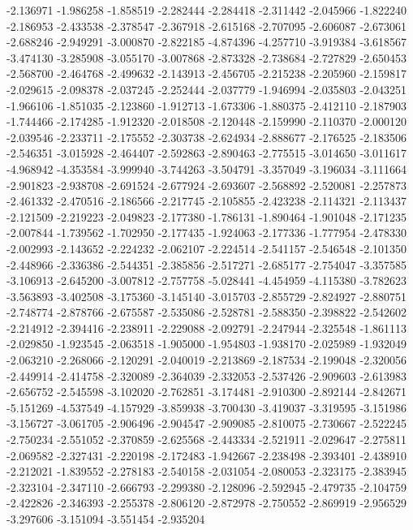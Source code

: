 -2.136971
-1.986258
-1.858519
-2.282444
-2.284418
-2.311442
-2.045966
-1.822240
-2.186953
-2.433538
-2.378547
-2.367918
-2.615168
-2.707095
-2.606087
-2.673061
-2.688246
-2.949291
-3.000870
-2.822185
-4.874396
-4.257710
-3.919384
-3.618567
-3.474130
-3.285908
-3.055170
-3.007868
-2.873328
-2.738684
-2.727829
-2.650453
-2.568700
-2.464768
-2.499632
-2.143913
-2.456705
-2.215238
-2.205960
-2.159817
-2.029615
-2.098378
-2.037245
-2.252444
-2.037779
-1.946994
-2.035803
-2.043251
-1.966106
-1.851035
-2.123860
-1.912713
-1.673306
-1.880375
-2.412110
-2.187903
-1.744466
-2.174285
-1.912320
-2.018508
-2.120448
-2.159990
-2.110370
-2.000120
-2.039546
-2.233711
-2.175552
-2.303738
-2.624934
-2.888677
-2.176525
-2.183506
-2.546351
-3.015928
-2.464407
-2.592863
-2.890463
-2.775515
-3.014650
-3.011617
-4.968942
-4.353584
-3.999940
-3.744263
-3.504791
-3.357049
-3.196034
-3.111664
-2.901823
-2.938708
-2.691524
-2.677924
-2.693607
-2.568892
-2.520081
-2.257873
-2.461332
-2.470516
-2.186566
-2.217745
-2.105855
-2.423238
-2.114321
-2.113437
-2.121509
-2.219223
-2.049823
-2.177380
-1.786131
-1.890464
-1.901048
-2.171235
-2.007844
-1.739562
-1.702950
-2.177435
-1.924063
-2.177336
-1.777954
-2.478330
-2.002993
-2.143652
-2.224232
-2.062107
-2.224514
-2.541157
-2.546548
-2.101350
-2.448966
-2.336386
-2.544351
-2.385856
-2.517271
-2.685177
-2.754047
-3.357585
-3.106913
-2.645200
-3.007812
-2.757758
-5.028441
-4.454959
-4.115380
-3.782623
-3.563893
-3.402508
-3.175360
-3.145140
-3.015703
-2.855729
-2.824927
-2.880751
-2.748774
-2.878766
-2.675587
-2.535086
-2.528781
-2.588350
-2.398822
-2.542602
-2.214912
-2.394416
-2.238911
-2.229088
-2.092791
-2.247944
-2.325548
-1.861113
-2.029850
-1.923545
-2.063518
-1.905000
-1.954803
-1.938170
-2.025989
-1.932049
-2.063210
-2.268066
-2.120291
-2.040019
-2.213869
-2.187534
-2.199048
-2.320056
-2.449914
-2.414758
-2.320089
-2.364039
-2.332053
-2.537426
-2.909603
-2.613983
-2.656752
-2.545598
-3.102020
-2.762851
-3.174481
-2.910300
-2.892144
-2.842671
-5.151269
-4.537549
-4.157929
-3.859938
-3.700430
-3.419037
-3.319595
-3.151986
-3.156727
-3.061705
-2.906496
-2.904547
-2.909085
-2.810075
-2.730667
-2.522245
-2.750234
-2.551052
-2.370859
-2.625568
-2.443334
-2.521911
-2.029647
-2.275811
-2.069582
-2.327431
-2.220198
-2.172483
-1.942667
-2.238498
-2.393401
-2.438910
-2.212021
-1.839552
-2.278183
-2.540158
-2.031054
-2.080053
-2.323175
-2.383945
-2.323104
-2.347110
-2.666793
-2.299380
-2.128096
-2.592945
-2.479735
-2.104759
-2.422826
-2.346393
-2.255378
-2.806120
-2.872978
-2.750552
-2.869919
-2.956529
-3.297606
-3.151094
-3.551454
-2.935204
